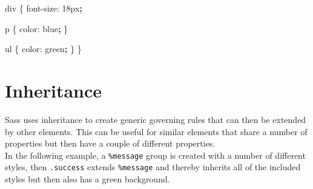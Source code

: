 \documentclass[]{book}
\newenvironment{Shaded}{\begin{snugshade}}{\end{snugshade}}
\newcommand{\KeywordTok}[1]{\textcolor[rgb]{0.13,0.29,0.53}{\textbf{#1}}}
\newcommand{\ExtensionTok}[1]{#1}
\newcommand{\NormalTok}[1]{#1}
\begin{document}
\begin{Shaded}
\begin{Highlighting}[]
\ExtensionTok{div}\NormalTok{ \{                }
    \ExtensionTok{font-size}\NormalTok{: 18px}\KeywordTok{;} 
                     
    \ExtensionTok{p}\NormalTok{ \{              }
        \ExtensionTok{color}\NormalTok{: blue}\KeywordTok{;} 
\NormalTok{    \}                }
                     
    \ExtensionTok{ul}\NormalTok{ \{             }
        \ExtensionTok{color}\NormalTok{: green}\KeywordTok{;}
\NormalTok{    \}                }
\NormalTok{\}                    }
\end{Highlighting}
\end{Shaded}

\section{Inheritance}\label{inheritance}

Sass uses inheritance to create generic governing rules that can then be
extended by other elements. This can be useful for similar elements that
share a number of properties but then have a couple of different
properties.\\
In the following example, a \texttt{\%message} group is created with a
number of different styles, then \texttt{.success} extends
\texttt{\%message} and thereby inherits all of the included styles but
then also has a green background.

\begin{Shaded}
\end{Shaded}
\end{document}
